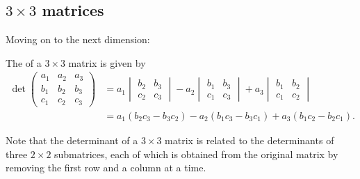\documentclass{ximera}
\begin{document}
\subsection{$3 \times 3$ matrices}
Moving on to the next dimension:
\begin{definition}
  The  of a $3 \times 3$ matrix is given by
  \begin{align*}
    \det
    \begin{pmatrix}
      a_1 &  a_2 & a_3 \\
      b_1 &  b_2 & b_3 \\
      c_1 &  c_2 & c_3
    \end{pmatrix}
    & =
      a_1
      \begin{vmatrix}
        b_2 & b_3 \\
        c_2 & c_3
      \end{vmatrix}
      - a_2
      \begin{vmatrix}
        b_1 & b_3 \\
        c_1 & c_3
      \end{vmatrix}
      + a_3
      \begin{vmatrix}
        b_1 & b_2 \\
        c_1 & c_2
      \end{vmatrix} \\
          & = a_1(b_2c_3 - b_3c_2) - a_2(b_1c_3 - b_3c_1) + a_3(b_1c_2 - b_2c_1).
  \end{align*}
\end{definition}

Note that the determinant of a $3 \times 3$ matrix is related to the
determinants of three $2 \times 2$ submatrices, each of which is obtained
from the original matrix by removing the first row and a column at a
time.
\end{document}
